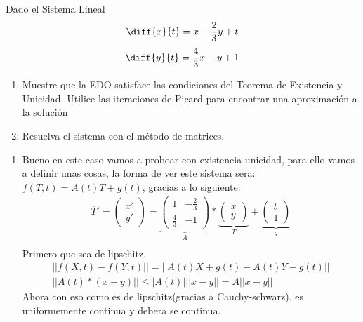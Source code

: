 \begin{prob}
  Dado el Sistema Lineal $$ \diff{x}{t}= x -\frac{2}{3} y + t $$  
   $$ \diff{y}{t}= \frac{4}{3}x  - y +1$$  
  \begin{enumerate}
      \item {
      Muestre que la EDO satisface las condiciones del Teorema de Existencia y Unicidad. Utilice
las iteraciones de Picard para encontrar una aproximación a la solución
      }
      \item {
      Resuelva el sistema con el método de matrices.
      }
  \end{enumerate}

\end{prob}
\begin{mdframed}

\begin{enumerate}
    \item {
        Bueno en este caso vamos a proboar con existencia unicidad, para ello vamos a definir unas cosas, la forma de ver este sistema sera: $f(T, t) = A(t)T +g(t)$, gracias a lo siguiente:
        \begin{gather*}
        \overline{T}'= 
            \begin{pmatrix}
                {x}' \\
                {y}' 
            \end{pmatrix} =  
            \underbrace{\begin{pmatrix}
                1 & -\frac{2}{3}\\
                \frac{4}{3} & -1 
            \end{pmatrix}}_{A}*
            \underbrace{\begin{pmatrix}
                x \\
                y 
            \end{pmatrix}}_{T} +\underbrace{\begin{pmatrix}
                t \\
                1 
                \end{pmatrix}}_{g}\\
        \end{gather*}
        Primero que sea de lipschitz.
        \begin{gather*}
            ||f(X, t)-f(Y, t)||=|| A(t)X +g(t) -A(t)Y - g(t)||\\
            ||  A(t)*(x-y)|| \leq |A(t)| ||x-y|| = A||x-y||
        \end{gather*}
        Ahora con eso como es de lipschitz(gracias a Cauchy-schwarz), es uniformemente continua y debera se continua.
}
\end{enumerate}
\end{mdframed}
